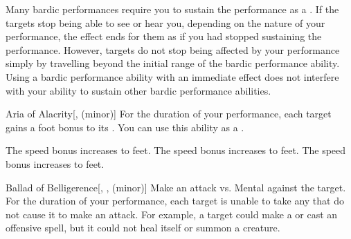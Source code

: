         Many bardic performances require you to sustain the performance as a .
        If the targets stop being able to see or hear you, depending on the nature of your performance, the effect ends for them as if you had stopped sustaining the performance.
        However, targets do not stop being affected by your performance simply by travelling beyond the initial range of the bardic performance ability.
        Using a bardic performance ability with an immediate effect does not interfere with your ability to sustain other bardic performance abilities.
        {
            \begin{freeability}{Aria of Alacrity}[,  (minor)]
                For the duration of your performance, each target gains a  foot bonus to its .
                You can use this ability as a .

                \rankline
                 The speed bonus increases to  feet.
                 The speed bonus increases to  feet.
                 The speed bonus increases to  feet.
            \end{freeability}

            \begin{freeability}{Ballad of Belligerence}[, ,  (minor)]
                Make an attack vs. Mental against the target.
                \hit For the duration of your performance, each target is unable to take any  that do not cause it to make an attack.
                For example, a target could make a  or cast an offensive spell, but it could not heal itself or summon a creature.


\end{freeability}}
